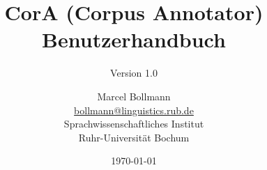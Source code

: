 \documentclass[11pt,a4paper,parskip=half]{scrartcl}
\begin{document}
\newcommand{\mmb}{Marcel Bollmann ({\small\url{bollmann@linguistics.rub.de}})}
\newcommand{\trans}[1]{"`{\small\texttt{#1}}"'}


\newenvironment{infobox}[1]{
  \begin{mdframed}[linewidth=1,leftmargin=20,rightmargin=20,%
    backgroundcolor=Yellow!50,linecolor=GreenYellow,%
    splittopskip=\topskip,skipbelow=0.5\baselineskip,%
    skipabove=\baselineskip,%
    roundcorner=6pt,%
    innerleftmargin=6pt,innerrightmargin=6pt,%
    innerbottommargin=.85\baselineskip,innertopmargin=0pt]
    \textbf{#1}\\
}{
  \end{mdframed}
}

\newenvironment{alertbox}[1]{
  \begin{mdframed}[linewidth=1,leftmargin=20,rightmargin=20,%
    backgroundcolor=Red!45,linecolor=Sepia,%
    splittopskip=\topskip,skipbelow=0.5\baselineskip,%
    skipabove=\baselineskip,%
    roundcorner=6pt,%
    innerleftmargin=6pt,innerrightmargin=6pt,%
    innerbottommargin=.85\baselineskip,innertopmargin=0pt]
    \textbf{#1}\\
}{
  \end{mdframed}
}


\pagestyle{fancy}


\title{CorA (Corpus Annotator)\\Benutzerhandbuch}
\subtitle{Version 1.0} \author{Marcel
  Bollmann\\\url{bollmann@linguistics.rub.de}\\Sprachwissenschaftliches
  Institut\\Ruhr-Universität Bochum} \date{\today}
\maketitle

\tableofcontents
\newpage

\end{document}
